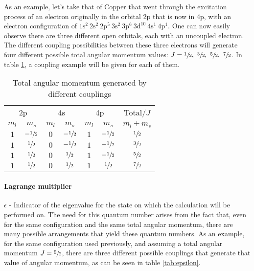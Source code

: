 As an example, let's take that of Copper that went through the excitation process of an electron originally in the orbital 2p that is now in 4p, with an electron configuration of $1\text{s}^2\ 2\text{s}^2\ 2\text{p}^5\ 3\text{s}^2\ 3\text{p}^6\ 3\text{d}^{10}\ 4\text{s}^1\  4\text{p}^1 $. One can now easily observe there are three different open orbitals, each with an uncoupled electron. The different coupling possibilities between these three electrons will generate four different possible total angular momentum values: $J=\sfrac{1}{2},\ \sfrac{3}{2},\ \sfrac{5}{2},\ \sfrac{7}{2}$. In table \ref{tab:tot_ang_mom}, a coupling example will be given for each of them.


\begin{table}[h!]
    \centering
    \caption{Total angular momentum generated by different couplings}
    \label{tab:tot_ang_mom}
    \begin{tabular}{cc| cc | cc|c}
        \toprule \multicolumn{2}{c|}{2p}&\multicolumn{2}{c|}{4s}&\multicolumn{2}{c|}{4p}&Total/$J$\\
        $m_l$ & $m_s$ & $m_l$&$m_s$&$m_l$&$m_s$&$m_l+m_s$\\\midrule
        $1$&$-\sfrac{1}{2}$&$0$&$-\sfrac{1}{2}$&$1$&$-\sfrac{1}{2}$&$\sfrac{1}{2}$\\
        $1$&$\sfrac{1}{2}$&$0$&$-\sfrac{1}{2}$&$1$&$-\sfrac{1}{2}$&$\sfrac{3}{2}$\\
        $1$&$\sfrac{1}{2}$&$0$&$\sfrac{1}{2}$&$1$&$-\sfrac{1}{2}$&$\sfrac{5}{2}$\\
        $1$&$\sfrac{1}{2}$&$0$&$\sfrac{1}{2}$&$1$&$\sfrac{1}{2}$&$\sfrac{7}{2}$\\
    \end{tabular}
\end{table}

\paragraph{Lagrange multiplier} $\epsilon$ - Indicator of the eigenvalue for the state on which the calculation will be performed on. The need for this quantum number arises from the fact that, even for the same configuration and the same total angular momentum, there are many possible arrangements that yield these quantum numbers. As an example, for the same configuration used previously, and assuming a total angular momentum $J=\sfrac{5}{2}$, there are three different possible couplings that generate that value of angular momentum, as can be seen in table \ref{tab:epsilon}.


